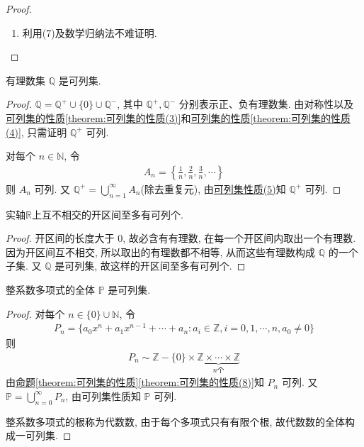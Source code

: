 \documentclass[../../main.tex]{subfiles}%
\begin{document}
\begin{proof}
\begin{enumerate}[(1)]
\item 利用(7)及数学归纳法不难证明.
\end{enumerate}
\end{proof}

\begin{example}
有理数集 $\mathbb{Q}$ 是可列集.
\end{example}
\begin{proof}
$\mathbb{Q} = \mathbb{Q}^+ \cup \{0\} \cup \mathbb{Q}^-$, 其中 $\mathbb{Q}^+, \mathbb{Q}^-$ 分别表示正、负有理数集. 由对称性以及\hyperref[theorem:可列集的性质(3)]{可列集的性质\ref{theorem:可列集的性质(3)}}和\hyperref[theorem:可列集的性质(4)]{可列集的性质\ref{theorem:可列集的性质(4)}}, 只需证明 $\mathbb{Q}^+$ 可列.

对每个 $n \in \mathbb{N}$, 令
\begin{align*}
A_n = \left\{\frac{1}{n}, \frac{2}{n}, \frac{3}{n}, \cdots\right\}
\end{align*}
则 $A_n$ 可列. 又 $\mathbb{Q}^+ = \bigcup_{n = 1}^{\infty} A_n$(除去重复元), 由\hyperref[theorem:可列集的性质]{可列集性质(5)}知 $\mathbb{Q}^+$ 可列.
\end{proof}

\begin{proposition}\label{proposition:实轴上互不相交的开区间至多有可列个}
实轴$\mathbb{R}$上互不相交的开区间至多有可列个.
\end{proposition}
\begin{proof}
开区间的长度大于 $0$, 故必含有有理数, 在每一个开区间内取出一个有理数. 因为开区间互不相交, 所以取出的有理数都不相等, 从而这些有理数构成 $\mathbb{Q}$ 的一个子集. 又 $\mathbb{Q}$ 是可列集, 故这样的开区间至多有可列个.
\end{proof}

\begin{example}
整系数多项式的全体 $\mathbb{P}$ 是可列集.
\end{example}
\begin{proof}
对每个 $n \in \{0\} \cup \mathbb{N}$, 令
\begin{align*}
P_n = \{a_0x^n + a_1x^{n - 1} + \cdots + a_n : a_i \in \mathbb{Z}, i = 0, 1, \cdots, n, a_0 \neq 0\}
\end{align*}
则
\begin{align*}
P_n \sim \mathbb{Z} - \{0\} \times \underbrace{\mathbb{Z} \times \cdots \times \mathbb{Z}}_{n 个}
\end{align*}
由\hyperref[theorem:可列集的性质(8)]{命题\ref{theorem:可列集的性质}\ref{theorem:可列集的性质(8)}}知 $P_n$ 可列. 又 $\mathbb{P} = \bigcup_{n = 0}^{\infty} P_n$, 由可列集性质知 $\mathbb{P}$ 可列.

整系数多项式的根称为代数数, 由于每个多项式只有有限个根, 故代数数的全体构成一可列集.
\end{proof}
\end{document}
